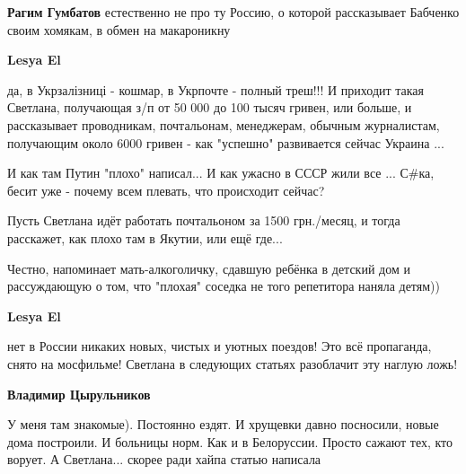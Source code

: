 \begin{itemize}
\begin{itemize}
\textbf{Рагим Гумбатов} естественно не про ту Россию, о которой рассказывает Бабченко своим хомякам, в обмен на макароникну

 
\textbf{Lesya El} 

да, в Укрзалізниці - кошмар, в Укрпочте - полный треш!!! И приходит такая
Светлана, получающая з/п от 50 000 до 100 тысяч гривен, или больше, и
рассказывает проводникам, почтальонам, менеджерам, обычным журналистам,
получающим около 6000 гривен - как "успешно" развивается сейчас Украина ... 

И как там Путин "плохо" написал... И как ужасно в СССР жили все ...  С\#ка,
бесит уже - почему всем плевать, что происходит сейчас? 

Пусть Светлана идёт работать почтальоном за 1500 грн./месяц, и тогда расскажет,
как плохо там в Якутии, или ещё где... 

Честно, напоминает мать-алкоголичку, сдавшую ребёнка в детский дом и
рассуждающую о том, что "плохая" соседка не того репетитора наняла детям))


 
\textbf{Lesya El} 

нет в России никаких новых, чистых и уютных поездов! Это всё пропаганда, снято
на мосфильме! Светлана в следующих статьях разоблачит эту наглую ложь!

 
\textbf{Владимир Цырульников} 

У меня там знакомые). Постоянно ездят. И хрущевки давно посносили, новые дома
построили. И больницы норм. Как и в Белоруссии. Просто сажают тех, кто ворует.
А Светлана... скорее ради хайпа статью написала

 

\end{itemize}
\end{itemize}
